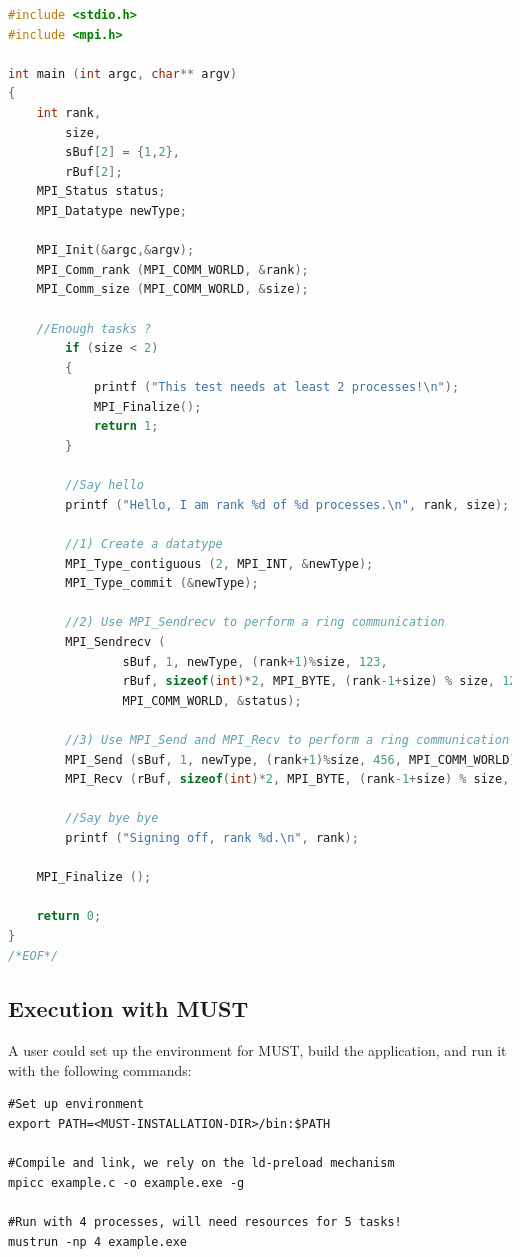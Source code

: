 \documentclass[english]{scrartcl}
\begin{document}
\begin{lstlisting}[tabsize=3,numbers=none,basicstyle=\scriptsize,%
	breaklines=true,language=C, frame=single,%
	commentstyle=\color{LGREY}, keywordstyle=\bfseries,%
	identifierstyle=\bfseries, numbers=left, numbersep=5pt,numberstyle=\tiny,%
	name=example-interface-listing, firstnumber=1]
#include <stdio.h>
#include <mpi.h>

int main (int argc, char** argv)
{
    int rank,
        size,
        sBuf[2] = {1,2},
        rBuf[2];
    MPI_Status status;
    MPI_Datatype newType;

    MPI_Init(&argc,&argv);
    MPI_Comm_rank (MPI_COMM_WORLD, &rank);
    MPI_Comm_size (MPI_COMM_WORLD, &size);

    //Enough tasks ?
    	if (size < 2)
    	{
    		printf ("This test needs at least 2 processes!\n");
    		MPI_Finalize();
    		return 1;
    	}

    	//Say hello
    	printf ("Hello, I am rank %d of %d processes.\n", rank, size);

    	//1) Create a datatype
    	MPI_Type_contiguous (2, MPI_INT, &newType);
    	MPI_Type_commit (&newType);

    	//2) Use MPI_Sendrecv to perform a ring communication
    	MPI_Sendrecv (
    	        sBuf, 1, newType, (rank+1)%size, 123,
    	        rBuf, sizeof(int)*2, MPI_BYTE, (rank-1+size) % size, 123,
    	        MPI_COMM_WORLD, &status);

    	//3) Use MPI_Send and MPI_Recv to perform a ring communication
    	MPI_Send (sBuf, 1, newType, (rank+1)%size, 456, MPI_COMM_WORLD);
    	MPI_Recv (rBuf, sizeof(int)*2, MPI_BYTE, (rank-1+size) % size, 456, MPI_COMM_WORLD, &status);

    	//Say bye bye
    	printf ("Signing off, rank %d.\n", rank);

    MPI_Finalize ();

    return 0;
}
/*EOF*/
\end{lstlisting}

\subsection{Execution with MUST}

A user could set up the environment for MUST, build the application, and run
it with the following commands:

\begin{verbatim}
#Set up environment
export PATH=<MUST-INSTALLATION-DIR>/bin:$PATH

#Compile and link, we rely on the ld-preload mechanism
mpicc example.c -o example.exe -g

#Run with 4 processes, will need resources for 5 tasks!
mustrun -np 4 example.exe
\end{verbatim}
\end{document}
